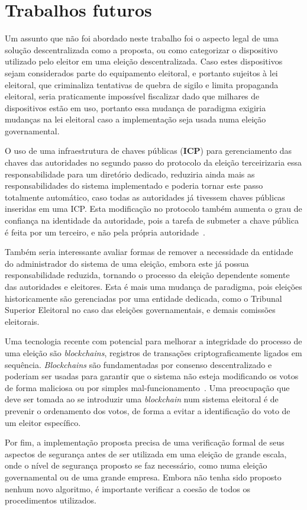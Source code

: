 \section{Trabalhos futuros}

Um assunto que não foi abordado neste trabalho foi o aspecto legal de uma
solução descentralizada como a proposta, ou como categorizar o dispositivo
utilizado pelo eleitor em uma eleição descentralizada. Caso estes dispositivos
sejam considerados parte do equipamento eleitoral, e portanto sujeitos à lei
eleitoral, que criminaliza tentativas de quebra de sigilo e limita propaganda
eleitoral, seria praticamente impossível fiscalizar dado que milhares de
dispositivos estão em uso, portanto essa mudança de paradigma exigiria mudanças
na lei eleitoral caso a implementação seja usada numa eleição governamental.

O uso de uma infraestrutura de chaves públicas (\textbf{ICP}) para
gerenciamento das chaves das autoridades no segundo passo do protocolo da
eleição terceirizaria essa responsabilidade para um diretório dedicado,
reduziria ainda mais as responsabilidades do sistema implementado e poderia
tornar este passo totalmente automático, caso todas as autoridades já tivessem
chaves públicas inseridas em uma ICP. Esta modificação no protocolo também
aumenta o grau de confiança na identidade da autoridade, pois a tarefa de
submeter a chave pública é feita por um terceiro, e não pela própria
autoridade~\cite{nash2001pki}.

Também seria interessante avaliar formas de remover a necessidade da entidade
do administrador do sistema de uma eleição, embora este já possua
responsabilidade reduzida, tornando o processo da eleição dependente somente
das autoridades e eleitores. Esta é mais uma mudança de paradigma, pois
eleições historicamente são gerenciadas por uma entidade dedicada, como o
Tribunal Superior Eleitoral no caso das eleições governamentais, e demais
comissões eleitorais.

Uma tecnologia recente com potencial para melhorar a integridade do processo de
uma eleição são \textit{blockchains}, registros de transações
criptograficamente ligados em sequência. \textit{Blockchains} são fundamentadas
por consenso descentralizado e poderiam ser usadas para garantir que o sistema
não esteja modificando os votos de forma maliciosa ou por simples
mal-funcionamento~\cite{christidis2016blockchains}. Uma preocupação que deve
ser tomada ao se introduzir uma \textit{blockchain} num sistema eleitoral é de
prevenir o ordenamento dos votos, de forma a evitar a identificação do voto de
um eleitor específico.

Por fim, a implementação proposta precisa de uma verificação formal de seus
aspectos de segurança antes de ser utilizada em uma eleição de grande escala,
onde o nível de segurança proposto se faz necessário, como numa eleição
governamental ou de uma grande empresa. Embora não tenha sido proposto nenhum
novo algoritmo, é importante verificar a coesão de todos os procedimentos
utilizados.
